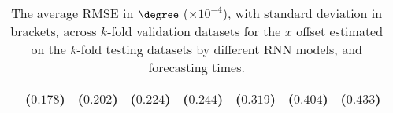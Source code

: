 \begin{table}[!ht]
{\begin{tabular}{|c|c|c|c|c|c|c|c|}
			 & ($0.178$) & ($0.202$) & \textbf{(}$\mathbf{0.224}$\textbf{)} & \textbf{(}$\mathbf{0.244}$\textbf{)} & \textbf{(}$\mathbf{0.319}$\textbf{)} & \textbf{(}$\mathbf{0.404}$\textbf{)} & ($0.433$) \\ \hline
		\end{tabular}
	}
	\caption{The average RMSE in $\degree$ ($\times 10^{-4}$), with standard deviation in brackets, across $k$-fold validation datasets for the $x$ offset estimated on the $k$-fold testing datasets by different RNN models, and forecasting times.}
	\label{tab:mann_whitney_longitude_no_abs_RMSE}
\end{table}